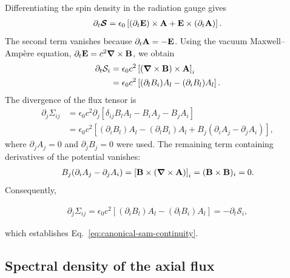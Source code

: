 Differentiating the spin density in the radiation gauge gives
\begin{align}
  \partial_t\boldsymbol{\mathcal S}
  =\epsilon_0\left[
    (\partial_t{\bf E})\times{\bf A}
    +{\bf E}\times(\partial_t{\bf A})\right].
\end{align}
The second term vanishes because $\partial_t{\bf A}=-{\bf E}$.
Using the vacuum Maxwell--Amp\`ere equation,
$\partial_t{\bf E}=c^2\boldsymbol{\nabla}\times{\bf B}$, we obtain
\begin{align}
  \partial_t\mathcal S_i
  &=\epsilon_0c^2\left[
    (\boldsymbol{\nabla}\times{\bf B})\times{\bf A}\right]_i\nonumber\\
  &=\epsilon_0c^2\left[
    (\partial_l B_i)A_l-(\partial_i B_l)A_l\right].
  \label{eq:canonical-sam-time-derivative}
\end{align}
The divergence of the flux tensor is
\begin{align}
  \partial_j\Sigma_{ij}
  &=\epsilon_0c^2\partial_j\left[
    \delta_{ij}B_l A_l-B_i A_j-B_j A_i\right]\nonumber\\
  &=\epsilon_0c^2\left[
    (\partial_i B_l)A_l-(\partial_l B_i)A_l
    +B_j(\partial_i A_j-\partial_j A_i)\right],
\end{align}
where $\partial_j A_j=0$ and $\partial_j B_j=0$ were used.
The remaining term containing derivatives of the potential vanishes:
\begin{align}
  B_j(\partial_i A_j-\partial_j A_i)
  =\left[{\bf B}\times(\boldsymbol{\nabla}\times{\bf A})\right]_i
  =({\bf B}\times{\bf B})_i=0.
\end{align}
Consequently,
\begin{highlightbox}
  \begin{align}
    \partial_j\Sigma_{ij}
    =\epsilon_0c^2\left[
      (\partial_i B_l)A_l-(\partial_l B_i)A_l\right]
    =-\partial_t\mathcal S_i,
    \label{eq:canonical-sam-continuity-verification}
  \end{align}
\end{highlightbox}
which establishes Eq.~\eqref{eq:canonical-sam-continuity}.

\subsection{Spectral density of the axial flux}

